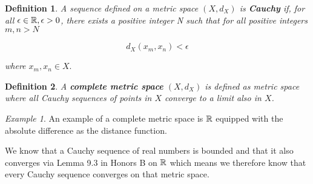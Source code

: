 \documentclass{article}
\newtheorem{definition}{Definition}
\theoremstyle{remark}
\newtheorem{example}{Example}
\begin{document}
\begin{definition} A sequence defined on a metric space $(X, d_X)$ is \textbf{Cauchy} if, for all $\epsilon \in \Bbb R, \epsilon > 0$, there exists a positive integer N such that for all positive integers $m, n >N $ 

$$d_X(x_m, x_n) < \epsilon$$

\noindent where $x_m, x_n \in X.$
\end{definition}


\begin{definition} A \textbf{complete metric space} $(X, d_X)$ is defined as metric space where all Cauchy sequences of points in $X$ converge to a limit also in $X$. 
\end{definition}

\begin{example}
An example of a complete metric space is $\Bbb R$ equipped with the absolute difference as the distance function.

We know that a Cauchy sequence of real numbers is bounded and that it also converges via Lemma 9.3 in Honors B on $\Bbb R$ which means we therefore know that every Cauchy sequence converges on that metric space.
\end{example}
\end{document}
